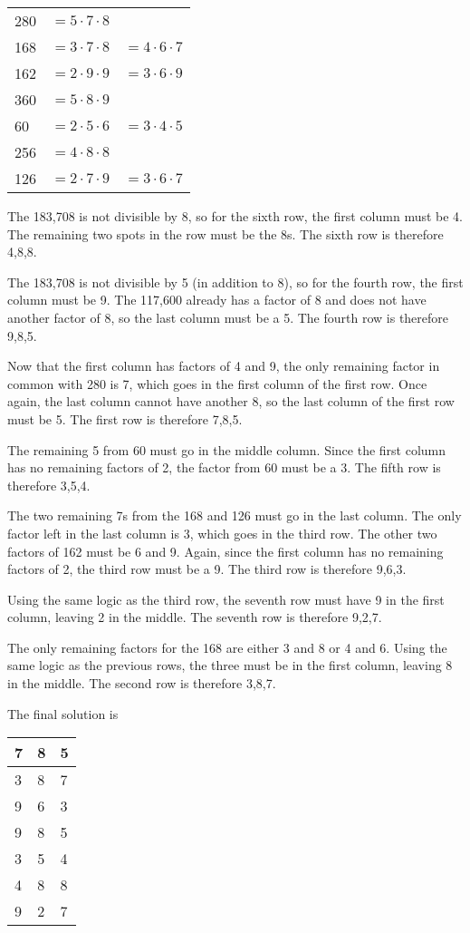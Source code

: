 \documentclass{article}
\begin{document}
\begin{center}
\setlength{\tabcolsep}{3pt}
\begin{tabular}{lll}
280 & $=5\cdot7\cdot8$ \\
168 & $=3\cdot7\cdot8$ & $=4\cdot6\cdot7$ \\
162 & $=2\cdot9\cdot9$ & $=3\cdot6\cdot9$ \\
360 & $=5\cdot8\cdot9$ \\
60  & $=2\cdot5\cdot6$ & $=3\cdot4\cdot5$ \\
256 & $=4\cdot8\cdot8$ \\
126 & $=2\cdot7\cdot9$ & $=3\cdot6\cdot7$
\end{tabular}
\end{center}

The 183,708 is not divisible by 8, so for the sixth row, the first column must be 4.
The remaining two spots in the row must be the 8s.
The sixth row is therefore 4,8,8.

The 183,708 is not divisible by 5 (in addition to 8), so for the fourth row, the first column must be 9.
The 117,600 already has a factor of 8 and does not have another factor of 8, so the last column must be a 5.
The fourth row is therefore 9,8,5.

Now that the first column has factors of 4 and 9, the only remaining factor in common with 280 is 7, which goes in the first column of the first row.
Once again, the last column cannot have another 8, so the last column of the first row must be 5.
The first row is therefore 7,8,5.

The remaining 5 from 60 must go in the middle column.
Since the first column has no remaining factors of 2, the factor from 60 must be a 3.
The fifth row is therefore 3,5,4.

The two remaining 7s from the 168 and 126 must go in the last column.
The only factor left in the last column is 3, which goes in the third row.
The other two factors of 162 must be 6 and 9.
Again, since the first column has no remaining factors of 2, the third row must be a 9.
The third row is therefore 9,6,3.

Using the same logic as the third row, the seventh row must have 9 in the first column, leaving 2 in the middle.
The seventh row is therefore 9,2,7.

The only remaining factors for the 168 are either 3 and 8 or 4 and 6.
Using the same logic as the previous rows, the three must be in the first column, leaving 8 in the middle.
The second row is therefore 3,8,7.

The final solution is

\begin{center}
\begin{tabular}{|C{0.75in}|C{0.75in}|C{0.75in}|}
 & 8 & 5 \\
 & 8 & 7 \\
 & 6 & 3 \\
 & 8 & 5 \\
 & 5 & 4 \\
 & 8 & 8 \\
 & 2 & 7 \\
\hline
\end{tabular}
\end{center}
\end{document}
